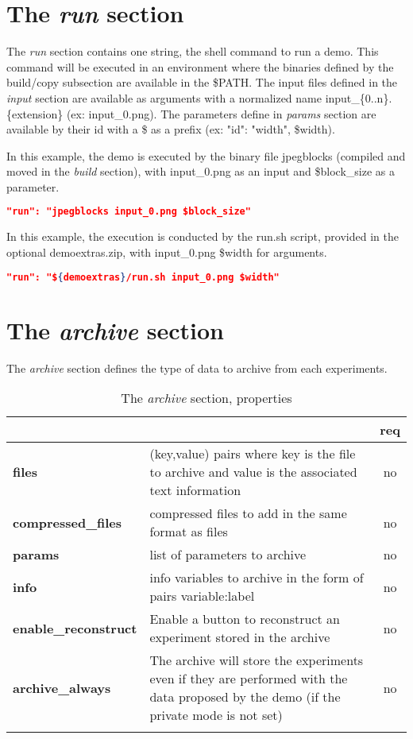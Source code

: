 \section{The \emph{run} section}

The \emph{run} section contains one string, the shell command to run a demo.
This command will be executed in an environment where the
binaries defined by the build/copy subsection are available in the \$PATH.
The input files defined in the \emph{input} section are available as arguments
with a normalized name input\_\{0..n\}.\{extension\} (ex: input\_0.png). 
The parameters define in \emph{params} section are available by their id with a 
\$ as a prefix (ex: "id": "width", \$width).


In this example, the demo is executed by the binary file jpegblocks
(compiled and moved in the \emph{build} section), 
with input\_0.png as an input and \$block\_size as a parameter.
\begin{lstlisting}[language=json,firstnumber=1]
  "run": "jpegblocks input_0.png $block_size"\end{lstlisting}


In this example, the execution is conducted by the run.sh script, provided in the
optional demoextras.zip, with input\_0.png \$width for arguments.
\begin{lstlisting}[language=json,firstnumber=1]
  "run": "${demoextras}/run.sh input_0.png $width"\end{lstlisting}


\section{The \emph{archive} section}

The \emph{archive} section defines the type of data to archive from each experiments.

\begin{longtable}{|>{\bf}L{\linewidth}|L{\linewidth}|c|}
\hline
{}     &  & {\bf req} \tabularnewline 
\hline \hline
 files    & (key,value) pairs where key is the file to archive and value is 
            the associated text information & no \\ \hline
 compressed\_\-files   & compressed files to add in the same format 
as files & no \\ \hline
 params  & list of parameters to archive & no \\ \hline
 info    & info variables to archive in the form of pairs variable:label & no \\ \hline
 enable\_reconstruct & Enable a button to reconstruct an experiment stored in the archive & no \\ \hline
 archive\_always     & The archive will store the experiments even if they are performed with the data proposed by the demo (if the private mode is not set) & no \\ \hline
\caption{The \emph{archive} section, properties}
\end{longtable}


